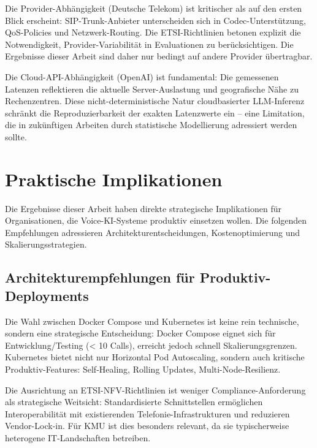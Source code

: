 Die Provider-Abhängigkeit (Deutsche Telekom) ist kritischer als auf den ersten Blick erscheint: \acrshort{SIP}-Trunk-Anbieter unterscheiden sich in Codec-Unterstützung, \acrshort{QoS}-Policies und Netzwerk-Routing. Die \acrshort{ETSI}-Richtlinien \parencite{ETSI-REL} betonen explizit die Notwendigkeit, Provider-Variabilität in Evaluationen zu berücksichtigen. Die Ergebnisse dieser Arbeit sind daher nur bedingt auf andere Provider übertragbar.

Die Cloud-\acrshort{API}-Abhängigkeit (OpenAI) ist fundamental: Die gemessenen Latenzen reflektieren die aktuelle Server-Auslastung und geografische Nähe zu Rechenzentren. Diese nicht-deterministische Natur cloudbasierter \acrshort{LLM}-Inferenz \parencite{ReliabilityVirtualizedNetworks} schränkt die Reproduzierbarkeit der exakten Latenzwerte ein -- eine Limitation, die in zukünftigen Arbeiten durch statistische Modellierung adressiert werden sollte.

\section{Praktische Implikationen}

Die Ergebnisse dieser Arbeit haben direkte strategische Implikationen für Organisationen, die Voice-\acrshort{KI}-Systeme produktiv einsetzen wollen. Die folgenden Empfehlungen adressieren Architekturentscheidungen, Kostenoptimierung und Skalierungsstrategien.

\subsection{Architekturempfehlungen für Produktiv-Deployments}

Die Wahl zwischen Docker Compose und Kubernetes ist keine rein technische, sondern eine strategische Entscheidung: Docker Compose eignet sich für Entwicklung/Testing (< 10 Calls), erreicht jedoch schnell Skalierungsgrenzen. Kubernetes bietet nicht nur Horizontal Pod Autoscaling, sondern auch kritische Produktiv-Features: Self-Healing, Rolling Updates, Multi-Node-Resilienz.

Die Ausrichtung an \acrshort{ETSI}-\acrshort{NFV}-Richtlinien \parencite{ETSI-NFV,ETSI-REL} ist weniger Compliance-Anforderung als strategische Weitsicht: Standardisierte Schnittstellen ermöglichen Interoperabilität mit existierenden Telefonie-Infrastrukturen und reduzieren Vendor-Lock-in. Für \acrshort{KMU} ist dies besonders relevant, da sie typischerweise heterogene IT-Landschaften betreiben.

